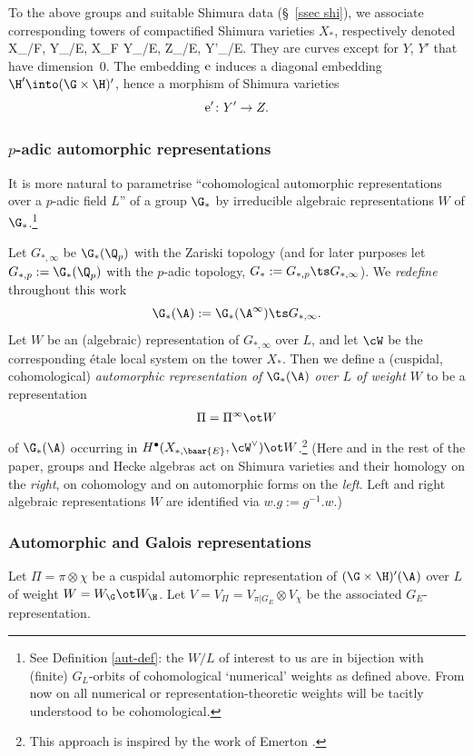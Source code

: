 To the above groups and suitable Shimura data (\S~\ref{ssec shi}), we associate
corresponding towers of   compactified Shimura varieties $X_{*}$, respectively denoted
\beq {}X_{/F}, \qquad Y_{/E}, \qquad X\times_{F} Y_{/E}, \qquad Z_{/E}, \qquad Y'_{/E}.
\eeq
  They are curves except for $Y$, $Y'$ that have dimension~$0$. The embedding ${\rm e}$ induces a diagonal embedding $\H'\into (\G\times \H)'$, hence a morphism of Shimura varieties
$${\rm e}' \colon  Y' \to Z.$$


\subsubsection{$p$-adic automorphic representations}
It is  more natural to parametrise ``cohomological automorphic representations over a $p$-adic field $L$'' of a group $\G_{*}$ by irreducible  algebraic representations $W$  of $\G_{*}$.\footnote{See Definition \ref{aut-def}: the  $W/L$ of interest to us are in bijection with (finite) $G_{L}$-orbits of cohomological `numerical'  weights as defined above. From now on all numerical or representation-theoretic weights will be tacitly understood to be cohomological.}

Let $G_{*, \infty}$ be $\G_{*}(\Q_{p})$ with the Zariski topology (and for later purposes let $G_{*, p}:=\G_{*}(\Q_{p})$ with the $p$-adic topology, $G_{*}:=G_{* , p} \ts G_{*,\infty}$).  We \emph{redefine} throughout this work
$$\G_{*}(\A):= \G_{*}(\A^{\infty})\ts G_{*, \infty}.$$
 Let $W$ be an (algebraic) representation of $G_{*, \infty}$ over $L$, and let $\cW $ be the corresponding  \'etale local system on the tower $X_{*}$. Then we define  a (cuspidal, cohomological)  \emph{automorphic representation of $\G_{*}(\A)$ over $L$ of weight $W$} to be a representation  $$\Pi=\Pi^{\infty}\ot W$$
of $\G_{*}(\A)$  occurring in $H^{\bullet}(X_{*, \baar{E}}, \cW^{\vee})\ot W$.\footnote{This approach is inspired by the work of Emerton \cite{emerton}.}
  (Here and in the rest of the paper, groups and Hecke algebras act on Shimura varieties and their homology on the \emph{right}, on cohomology and  on automorphic forms on the \emph{left}. Left and right algebraic representations $W$ are identified via $w.g:=g^{-1}.w$.)





\subsubsection{Automorphic and Galois representations}
Let $\Pi=\pi\otimes \chi$ be a cuspidal automorphic representation of $(\G\times \H)'(\A^{})$ over $L$ of weight $W=W_{\G}\ot W_{\H}$.
    Let $V=V_{\Pi}=V_{\pi|G_{E}}\otimes V_{\chi}$ be the associated $G_{E}$-representation.


